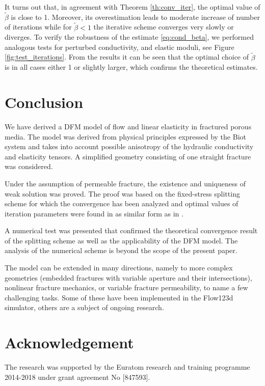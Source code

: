\documentclass[a4paper]{article}
\numberwithin{equation}{section}
\begin{document}
It turns out that, in agreement with Theorem \ref{th:conv_iter}, the optimal value of $\tilde\beta$ is close to 1.
Moreover, its overestimation leads to moderate increase of number of iterations while for $\tilde\beta<1$ the iterative scheme converges very slowly or diverges.
To verify the robustness of the estimate \eqref{eq:cond_beta}, we performed analogous tests for perturbed conductivity, and elastic moduli, see Figure \ref{fig:test_iterations}.
From the results it can be seen that the optimal choice of $\tilde\beta$ is in all cases either 1 or slightly larger, which confirms the theoretical estimates.


\section*{Conclusion}
We have derived a DFM model of flow and linear elasticity in fractured porous media.
The model was derived from physical principles expressed by the Biot system and takes into account possible anisotropy of the hydraulic conductivity and elasticity tensors.
A simplified geometry consisting of one straight fracture was considered.

Under the assumption of permeable fracture, the existence and uniqueness of weak solution was proved.
The proof was based on the fixed-stress splitting scheme for which the convergence has been analyzed and optimal values of iteration parameters were found in as similar form as in \cite{both2017robust}.

A numerical test was presented that confirmed the theoretical convergence result of the splitting scheme as well as the applicability of the DFM model.
The analysis of the numerical scheme is beyond the scope of the present paper.

The model can be extended in many directions, namely to more complex geometries (embedded fractures with variable aperture and their intersections), nonlinear fracture mechanics, %
or variable fracture permeability, %
to name a few challenging tasks.
Some of these have been implemented in the Flow123d simulator, others are a subject of ongoing research.


\section*{Acknowledgement}
The research was supported by the Euratom research and training programme 2014-2018 under grant agreement No [847593].
\end{document}
